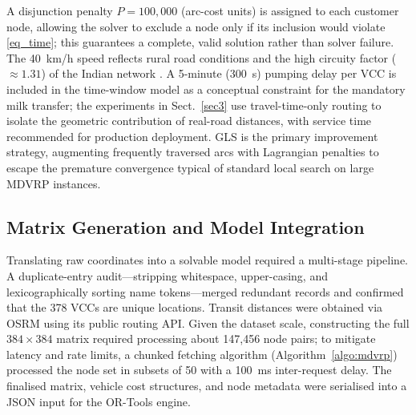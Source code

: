\documentclass{svproc}
\begin{document}
A disjunction penalty $P=100{,}000$ (arc-cost units) is assigned to each customer node, allowing the solver to exclude a node only if its inclusion would violate \eqref{eq_time}; this guarantees a complete, valid solution rather than solver failure. The 40~km/h speed reflects rural road conditions and the high circuity factor ($\approx1.31$) of the Indian network \cite{BALLOU2002}. A 5-minute (300~s) pumping delay per VCC is included in the time-window model as a conceptual constraint for the mandatory milk transfer; the experiments in Sect.~\ref{sec3} use travel-time-only routing to isolate the geometric contribution of real-road distances, with service time recommended for production deployment. GLS \cite{Voudouris1999} is the primary improvement strategy, augmenting frequently traversed arcs with Lagrangian penalties to escape the premature convergence typical of standard local search on large MDVRP instances.

\subsection{Matrix Generation and Model Integration}
\label{subsec2_4}

Translating raw coordinates into a solvable model required a multi-stage pipeline. A duplicate-entry audit---stripping whitespace, upper-casing, and lexicographically sorting name tokens---merged redundant records and confirmed that the 378 VCCs are unique locations. Transit distances were obtained via OSRM \cite{Luxen2011} using its public routing API. Given the dataset scale, constructing the full $384\times384$ matrix required processing about 147{,}456 node pairs; to mitigate latency and rate limits, a chunked fetching algorithm (Algorithm~\ref{algo:mdvrp}) processed the node set in subsets of 50 with a 100~ms inter-request delay. The finalised matrix, vehicle cost structures, and node metadata were serialised into a JSON input for the OR-Tools engine.
\end{document}
